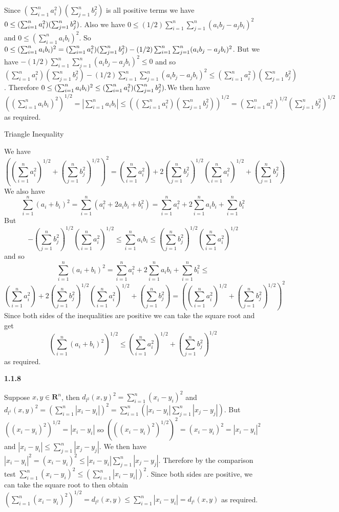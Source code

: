 \documentclass[12pt]{article}
\begin{document}
Since  $ (\sum_{i=1}^na_i^2)(\sum_{j=1}^n b_j^2)$ is all positive terms we have 
$\\0\leq (\sum_{i=1}^na_i^2)(\sum_{j=1}^n b_j^2)$. Also we have $0\leq (1/2)\sum^n_{i = 1}\sum^n_{j=1}(a_ib_j-a_jb_i)^2$ and $ 0\leq(\sum_{i=1}^n a_ib_i)^2$. So $ 0\leq(\sum_{i=1}^n a_ib_i)^2 = (\sum_{i=1}^na_i^2)(\sum_{j=1}^n b_j^2)-\\(1/2)\sum^n_{i = 1}\sum^n_{j=1}(a_ib_j-a_jb_i)^2$. But we have $-(1/2)\sum^n_{i = 1}\sum^n_{j=1}(a_ib_j-a_jb_i)^2\leq 0$ and so $(\sum_{i=1}^na_i^2)(\sum_{j=1}^n b_j^2)-(1/2)\sum^n_{i = 1}\sum^n_{j=1}(a_ib_j-a_jb_i)^2\leq (\sum_{i=1}^na_i^2)(\sum_{j=1}^n b_j^2)$. Therefore $0\leq (\sum_{i=1}^n a_ib_i)^2\leq(\sum_{i=1}^na_i^2)(\sum_{j=1}^n b_j^2).\\$We then have $((\sum_{i=1}^n a_ib_i)^2)^{1/2}=|\sum_{i=1}^n a_ib_i|\leq((\sum_{i=1}^na_i^2)(\sum_{j=1}^n b_j^2))^{1/2}=(\sum_{i=1}^na_i^2)^{1/2}(\sum_{j=1}^n b_j^2)^{1/2}$ as required. 

Triangle Inequality

We have \[\left((\sum_{i=1}^na_i^2)^{1/2}+(\sum_{j=1}^n b_j^2)^{1/2}\right)^2 = (\sum_{i=1}^na_i^2)+2(\sum_{j=1}^n b_j^2)^{1/2}(\sum_{i=1}^na_i^2)^{1/2}+(\sum_{j=1}^n b_j^2)\]
We also have \[\sum_{i=1}^n(a_i+b_i)^2 = \sum_{i=1}^n(a_i^2+2a_ib_i+b_i^2) =  \sum_{i=1}^na_i^2+2\sum_{i=1}^na_ib_i+\sum_{i=1}^n b_i^2\] But \[-(\sum_{j=1}^n b_j^2)^{1/2}(\sum_{i=1}^na_i^2)^{1/2}\leq\sum_{i=1}^na_ib_i\leq(\sum_{j=1}^n b_j^2)^{1/2}(\sum_{i=1}^na_i^2)^{1/2}\] and so
\[\sum_{i=1}^n(a_i+b_i)^2=\sum_{i=1}^na_i^2+2\sum_{i=1}^na_ib_i+\sum_{i=1}^n b_i^2\leq \]\[(\sum_{i=1}^na_i^2)+2(\sum_{j=1}^n b_j^2)^{1/2}(\sum_{i=1}^na_i^2)^{1/2}+(\sum_{j=1}^n b_j^2)=((\sum_{i=1}^na_i^2)^{1/2}+(\sum_{j=1}^n b_j^2)^{1/2})^2\]Since both sides of the inequalities are positive we can take the square root and get \[(\sum_{i=1}^n(a_i+b_i)^2)^{1/2}\leq (\sum_{i=1}^na_i^2)^{1/2}+(\sum_{j=1}^n b_j^2)^{1/2}\] as required.

\textbf{1.1.8}

Suppose $x,y\in \textbf{R}^n$, then $d_{l^2}(x,y)^2 = \sum_{i=1}^n(x_i-y_i)^2$ and $d_{l^1}(x,y)^2 = (\sum^n_{i=1}|x_i-y_i|)^2=\sum^n_{i=1}(|x_i-y_i|\sum^n_{j=1}|x_j-y_j|)$. But $((x_i-y_i)^2)^{1/2} = |x_i-y_i|$ so $(((x_i-y_i)^2)^{1/2})^2 = (x_i-y_i)^2 = |x_i-y_i|^2$ and $|x_i-y_i|\leq \sum^n_{j=1}|x_j-y_j|.$ We then have $|x_i-y_i|^2=(x_i-y_i)^2\leq |x_i-y_i|\sum^n_{j=1}|x_j-y_j|$. Therefore by the comparison test $ \sum_{i=1}^n(x_i-y_i)^2\leq (\sum^n_{i=1}|x_i-y_i|)^2$. Since both sides are positive, we can take the square root to then obtain $(\sum_{i=1}^n(x_i-y_i)^2)^{1/2}=d_{l^2}(x,y)\leq\sum^n_{i=1}|x_i-y_i|=d_{l^1}(x,y)$ as required. 
\end{document}
